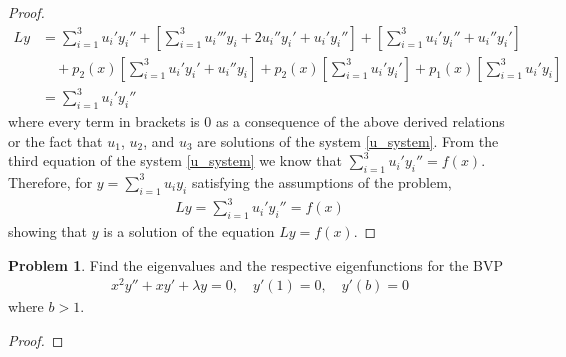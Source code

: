 \documentclass[12pt]{article}
\theoremstyle{definition}
\newtheorem{problem}{Problem}
\begin{document}
\begin{proof}
\begin{align*}
    Ly &= \sum_{i=1}^3 u_i' y_i'' + \left[\sum_{i=1}^{3}u_i'''y_i + 2u_i''y_i' + u_i'y_i''\right] + \left[\sum_{i=1}^{3}u_i'y_i'' + u_i''y_i'\right] \\
    &\quad + p_2(x)\left[\sum_{i=1}^{3}u_i'y_i' + u_i''y_i\right] + p_2(x)\left[\sum_{i=1}^{3}u_i'y_i'\right] + p_1(x)\left[\sum_{i=1}^{3}u_i'y_i\right] \\
    &= \sum_{i=1}^3 u_i' y_i''
  \end{align*}
  where every term in brackets is 0 as a consequence of the above derived relations or
  the fact that $u_1$, $u_2$, and $u_3$ are solutions of the system \eqref{u_system}.
  From the third equation of the system \eqref{u_system} we know that $\sum_{i=1}^3 u_i' y_i'' = f(x)$.
  Therefore, for $y = \sum_{i=1}^{3} u_i y_i$ satisfying the assumptions of the problem,
  \begin{align*}
    Ly = \sum_{i=1}^3 u_i' y_i'' = f(x)
  \end{align*}
  showing that $y$ is a solution of the equation $Ly = f(x)$.
\end{proof}
\newpage


\begin{problem}
  Find the eigenvalues and the respective eigenfunctions for the BVP
  \begin{align*}
    x^2y'' + xy' + \lambda y = 0, \quad y'(1) = 0, \quad y'(b) = 0
  \end{align*}
  where $b > 1$.
\end{problem}

\begin{proof}
\end{proof}
\end{document}
